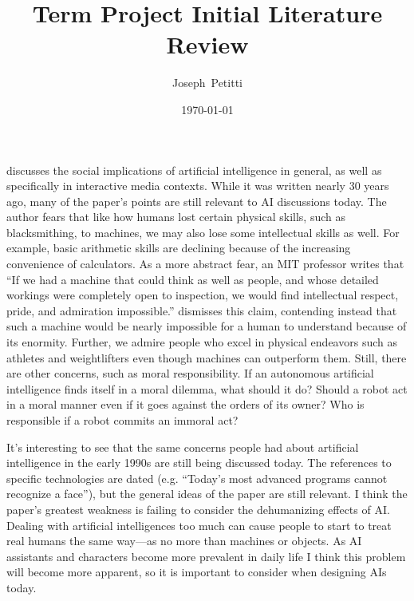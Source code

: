 \documentclass[a4paper, 10pt, american]{article}
\title{Term Project Initial Literature Review}
\author{Joseph~Petitti}
\date{\today}
\begin{document}
\maketitle

\cite{maybury1990mind} discusses the social implications of artificial
intelligence in general, as well as specifically in interactive media contexts.
While it was written nearly 30 years ago, many of the paper's points are still
relevant to AI discussions today. The author fears that like how humans lost
certain physical skills, such as blacksmithing, to machines, we may also lose
some intellectual skills as well. For example, basic arithmetic skills are
declining because of the increasing convenience of calculators. As a more
abstract fear, an MIT professor writes that ``If we had a machine that could
think as well as people, and whose detailed workings were completely open to
inspection, we would find intellectual respect, pride, and admiration
impossible.'' \citeauthor{maybury1990mind} dismisses this claim, contending
instead that such a machine would be nearly impossible for a human to understand
because of its enormity. Further, we admire people who excel in physical
endeavors such as athletes and weightlifters even though machines can outperform
them. Still, there are other concerns, such as moral responsibility. If an
autonomous artificial intelligence finds itself in a moral dilemma, what should
it do? Should a robot act in a moral manner even if it goes against the orders
of its owner? Who is responsible if a robot commits an immoral act?

It's interesting to see that the same concerns people had about artificial
intelligence in the early 1990s are still being discussed today. The references
to specific technologies are dated (e.g. ``Today's most advanced programs cannot
recognize a face''), but the general ideas of the paper are still relevant. I
think the paper's greatest weakness is failing to consider the dehumanizing
effects of AI. Dealing with artificial intelligences too much can cause people
to start to treat real humans the same way---as no more than machines or
objects. As AI assistants and characters become more prevalent in daily life I
think this problem will become more apparent, so it is important to consider
when designing AIs today.

\vspace{10pt}
\end{document}
